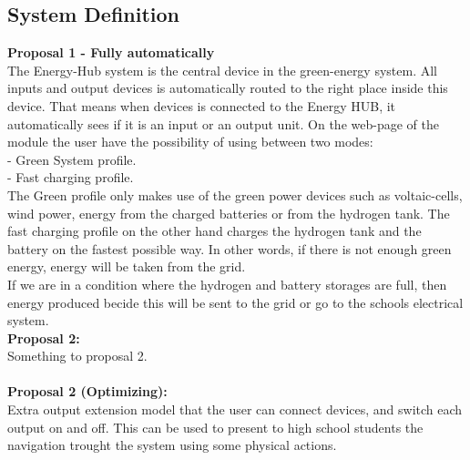 \subsection{System Definition}
\textbf{Proposal 1 - Fully automatically}\\
The Energy-Hub system is the central device in the green-energy system. All
inputs and output devices is automatically routed to the right place inside this
device. That means when devices is connected to the Energy HUB, it automatically
sees if it is an input or an output unit. On the web-page of the module the user
have the possibility of using between two modes:
\\ - Green System profile.
\\ - Fast charging profile.
\\The Green profile only makes use of the green power devices such as
voltaic-cells, wind power, energy from the charged batteries or from the
hydrogen tank. 
The fast charging profile on the other hand charges the hydrogen tank and the
battery on the fastest possible way. In other words, if there is not enough
green energy, energy will be taken from the grid.
\\If we are in a condition where the hydrogen and battery storages are full,
then energy produced becide this will be sent to the grid or go to the schools
electrical system.
 \\\textbf{Proposal 2:}\\
Something to proposal 2.\\
\\\textbf{Proposal 2 (Optimizing):}\\
Extra output extension model that the user can connect devices, and switch
each output on and off. This can be used to present to high school students
the navigation trought the system using some physical actions.